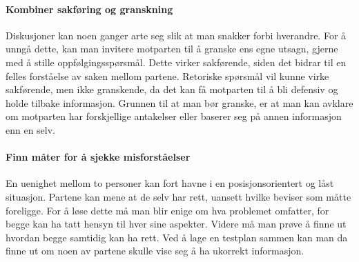 \paragraph{Kombiner sakføring og granskning}
Diskusjoner kan noen ganger arte seg slik at man snakker forbi hverandre.
For å unngå dette, kan man invitere motparten til å granske ens egne utsagn, gjerne med å stille oppfølgingsspørsmål.
Dette virker sakførende, siden det bidrar til en felles forståelse av saken mellom partene.
Retoriske spørsmål vil kunne virke sakførende, men ikke granskende, da det kan få motparten til å bli defensiv og holde tilbake informasjon.
Grunnen til at man bør granske, er at man kan avklare om motparten har forskjellige antakelser eller baserer seg på annen informasjon enn en selv.

\paragraph{Finn måter for å sjekke misforståelser}
En uenighet mellom to personer kan fort havne i en posisjonsorientert og låst situasjon.
Partene kan mene at de selv har rett, uansett hvilke beviser som måtte foreligge.
For å løse dette må man blir enige om hva problemet omfatter, for begge kan ha tatt hensyn til hver sine aspekter.
Videre må man prøve å finne ut hvordan begge samtidig kan ha rett.
Ved å lage en testplan sammen kan man da finne ut om noen av partene skulle vise seg å ha ukorrekt informasjon.


